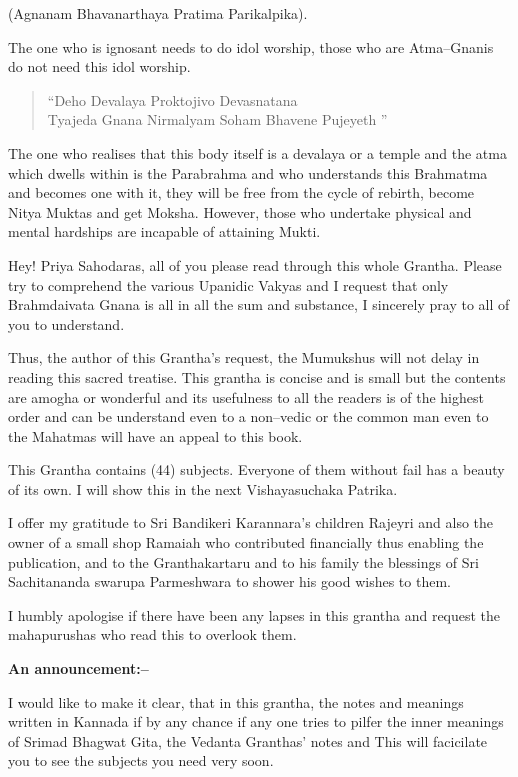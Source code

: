 \begin{center}
(Agnanam Bhavanarthaya Pratima Parikalpika).
\end{center}

The one who is ignosant needs to do idol worship, those who are Atma–Gnanis do not need this idol worship.

\begin{verse}
 “Deho Devalaya Proktojivo Devasnatana \\
 Tyajeda Gnana Nirmalyam Soham Bhavene Pujeyeth ”
\end{verse}

The one who realises that this body itself is a devalaya or a temple and the atma which dwells within is the Parabrahma and who understands this Brahmatma and becomes one with it, they will be free from the cycle of rebirth, become Nitya Muktas and get Moksha. However, those who undertake physical and mental hardships are incapable of attaining Mukti.

Hey! Priya Sahodaras, all of you please read through this whole Grantha. Please try to comprehend the various Upanidic Vakyas and I request that only Brahmdaivata Gnana is all in all the sum and substance, I sincerely pray to all of you to understand.

Thus, the author of this Grantha's request, the Mumukshus will not delay in reading this sacred treatise. This grantha is concise and is small but the contents are amogha or wonderful and its usefulness to all the readers is of the highest order and can be understand even to a non–vedic or the common man even to the Mahatmas will have an appeal to this book.

This Grantha contains (44) subjects. Everyone of them without fail has a beauty of its own. I will show this in the next Vishayasuchaka Patrika.

I offer my gratitude to Sri Bandikeri Karannara's children Rajeyri and also the owner of a small shop Ramaiah who contributed financially thus enabling the publication, and to the Granthakartaru and to his family the blessings of Sri Sachitananda swarupa Parmeshwara to shower his good wishes to them.

I humbly apologise if there have been any lapses in this grantha and request the mahapurushas who read this to overlook them.

\textbf{An announcement:–}

I would like to make it clear, that in this grantha, the notes and meanings written in Kannada if by any chance if any one tries to pilfer the inner meanings of Srimad Bhagwat Gita, the Vedanta Granthas' notes and This will facicilate you to see the subjects you need very soon.

